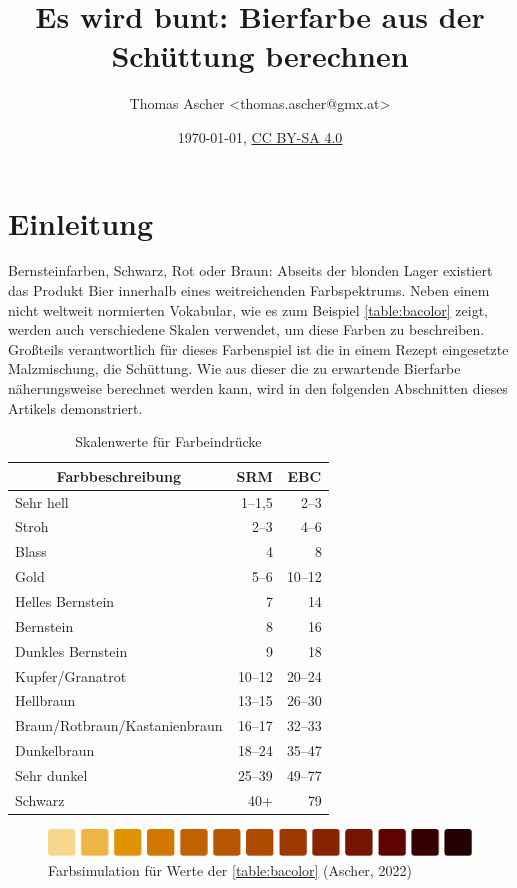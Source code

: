 \documentclass[a4paper,parskip=half]{scrartcl}
\title{Es wird bunt: Bierfarbe aus der Schüttung berechnen}
\author{Thomas Ascher <thomas.ascher@gmx.at>}
\date{\today, \href{http://creativecommons.org/licenses/by-sa/4.0/}{CC BY-SA 4.0}}
\begin{document}
\maketitle

\section*{Einleitung}

Bernsteinfarben, Schwarz, Rot oder Braun: Abseits der blonden Lager existiert das Produkt Bier innerhalb eines weitreichenden Farbspektrums. Neben einem nicht weltweit normierten Vokabular, wie es zum Beispiel \autoref{table:bacolor} zeigt, werden auch verschiedene Skalen verwendet, um diese Farben zu beschreiben. Großteils verantwortlich für dieses Farbenspiel ist die in einem Rezept eingesetzte Malzmischung, die Schüttung. Wie aus dieser die zu erwartende Bierfarbe näherungsweise berechnet werden kann, wird in den folgenden Abschnitten dieses Artikels demonstriert.

\begin{table}[H]
\centering
\begin{tabular}{lrr}
\toprule
\multicolumn{1}{c}{\textbf{Farbbeschreibung}} & \multicolumn{1}{c}{\textbf{SRM}} & \multicolumn{1}{c}{\textbf{EBC}} \\
\midrule
Sehr hell & 1–1,5 & 2–3  \\
Stroh & 2–3 & 4–6 \\
Blass & 4 & 8 \\
Gold & 5–6 & 10–12 \\
Helles Bernstein & 7 & 14 \\
Bernstein & 8 & 16 \\
Dunkles Bernstein & 9 & 18 \\
Kupfer/Granatrot & 10–12 & 20–24 \\
Hellbraun & 13–15 & 26–30 \\
Braun/Rotbraun/Kastanienbraun & 16–17 & 32–33 \\
Dunkelbraun & 18–24 & 35–47 \\
Sehr dunkel & 25–39 & 49–77 \\
Schwarz & 40+ & 79 \\
\bottomrule
\end{tabular}
\caption{Skalenwerte für Farbeindrücke \parencite{BA2021}}
\label{table:bacolor}
\end{table}

\begin{figure}[h]
\centering
\includegraphics[width=14cm]{colorscale.pdf}
\caption{Farbsimulation für Werte der \autoref{table:bacolor} (Ascher, 2022)}
\label{fig:mcucompare}
\end{figure}
\end{document}
